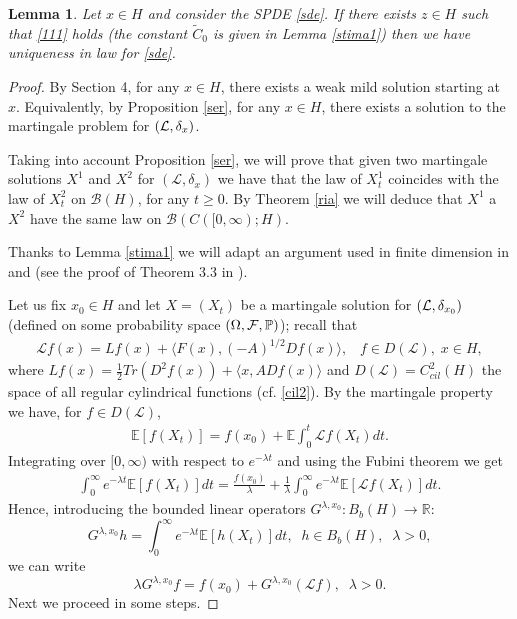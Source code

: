 \documentclass[preprint]{imsart}
\newtheorem{lemma}[theorem]{Lemma}
\def\P{\mathbb P}
\def\E{\mathbb E}
\def\R{\mathbb R}
\def\L{\mathcal L}
\begin{document}
 \begin{lemma}\label{loc}   Let $x \in H$ and consider the  SPDE \eqref{sde}. 
   If there exists   $z \in H$  such that \eqref{111} holds (the constant $\tilde C_0$ is given in Lemma \ref{stima1}) 
 then we have uniqueness in law for \eqref{sde}. 
\end{lemma}  
\begin{proof} By Section 4,  for any $x \in H$, there exists a weak mild solution starting at $x$. Equivalently, by Proposition \ref{ser}, for any $x \in H$, 
 there exists a  solution to the martingale problem for $({\cal L}, \delta_x)$.
 
Taking into account  Proposition \ref{ser}, we will prove   that given  two martingale solutions $X^1$ and $X^2$  for $ ( \L,  \delta_{x})$
 we   have that the law of $X_t^1$ coincides with the law of $X_t^2$ on ${\mathcal B}(H)$, for any $t \ge 0$. By Theorem \ref{ria} we will deduce that $X^1$ a $X^2$ have the same law on ${\mathcal B}(C([0, \infty);H)$.  
  
 
  
  Thanks to Lemma  \ref{stima1} we will  
 adapt an argument used  in finite dimension in \cite{SV79} and \cite{IW} (see the proof of Theorem 3.3 in \cite{IW}). 
 
Let us fix $x_0 \in H$ and let $X = (X_t)  $ be a martingale solution for
 $({\cal L}, \delta_{x_0})$
 (defined on some probability space $ (\Omega, {\cal F}, \P)$); recall that
\begin{eqnarray} \label{ll} 
\L f (x)  = 
L f (x) +  
\langle F(x),  (-A)^{1/2} Df(x) \rangle,\;\;\; f \in D(\L),\; x \in H,
\end{eqnarray}
 where $Lf (x) = \frac{1}{2} Tr(D^2 f(x)) + \langle x, ADf(x) \rangle$ 
 and  $D(\L) = C^2_{cil}(H)$ the space of all regular cylindrical functions
  (cf. \eqref{cil2}).
 By the martingale property we have, for $f \in D(\L)$,
\begin{gather*}
 \E [f(X_t)] = f(x_0) + \E \int_0^t {\L} f(X_t) dt.
\end{gather*}
Integrating over $[0, \infty)$ with respect to $e^{-\lambda t}$ and using the  Fubini theorem we get 
\begin{gather*}
 \int_0^{\infty} e^{-\lambda t} \E[f(X_t)] dt = \frac{f(x_0)}{\lambda} +
  \frac{1}{\lambda}  \int_0^{\infty} e^{-\lambda t} \E[\L f(X_t)] dt. 
\end{gather*} 
Hence, introducing the bounded linear operators $G^{\lambda,x_0} : B_b(H) \to \R$:
\begin{equation}\label{rggg}
G^{\lambda,x_0} h =  \int_0^{\infty} e^{-\lambda t} \E[h(X_t)] dt,  \;\; h \in B_b(H), \;\; \lambda > 0,
\end{equation}
we can write 
\begin{equation}\label{aqq3}
\lambda G^{\lambda,x_0} f = f(x_0) + G^{\lambda,x_0} (\L f),\;\; \lambda>0. 
\end{equation}
Next  we proceed in some steps.
 

\end{proof}
\end{document}
